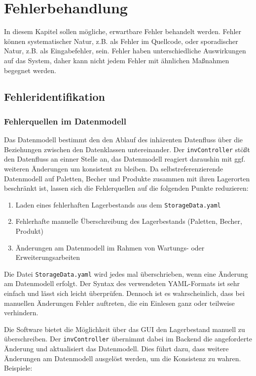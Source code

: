 \chapter{Fehlerbehandlung}\label{Fehlerbehandlung}

In diesem Kapitel sollen mögliche, erwartbare Fehler behandelt werden. 
Fehler können systematischer Natur, z.B. als Fehler im Quellcode, oder sporadischer Natur, z.B. als Eingabefehler, sein.
Fehler haben unterschiedliche Auswirkungen auf das System, daher kann nicht jedem Fehler mit ähnlichen Maßnahmen begegnet werden.

\section{Fehleridentifikation}

\subsection{Fehlerquellen im Datenmodell}

Das Datenmodell bestimmt den den Ablauf des inhärenten Datenfluss über die Beziehungen zwischen den Datenklassen untereinander.
Der \verb|invController| stößt den Datenfluss an einner Stelle an, das Datenmodell reagiert daraushin mit ggf. weiteren Änderungen um 
konsistent zu bleiben. 
Da selbstreferenzierende Datenmodell auf Paletten, Becher und Produkte zusammen mit ihren Lagerorten beschränkt ist,
lassen sich die Fehlerquellen auf die folgenden Punkte reduzieren:
\begin{enumerate}
    \item Laden eines fehlerhaften Lagerbestands aus dem \verb|StorageData.yaml|
    \item Fehlerhafte manuelle Überschreibung des Lagerbestands (Paletten, Becher, Produkt)
    \item Änderungen am Datenmodell im Rahmen von Wartungs- oder Erweiterungsarbeiten
\end{enumerate} 

Die Datei \verb|StorageData.yaml| wird jedes mal überschrieben, wenn eine Änderung am Datenmodell erfolgt.
Der Syntax des verwendeten YAML-Formats ist sehr einfach und lässt sich leicht überprüfen. 
Dennoch ist es wahrscheinlich, dass bei manuellen Änderungen Fehler auftreten, die ein Einlesen ganz oder teilweise verhindern.

Die Software bietet die Möglichkeit über das GUI den Lagerbestand manuell zu überschreiben. 
Der \verb|invController| übernimmt dabei im Backend die angeforderte Änderung und aktualisiert das Datenmodell.
Dies führt dazu, dass weitere Änderungen am Datenmodell ausgelöst werden, um die Konsistenz zu wahren.\\
Beispiele:\\

